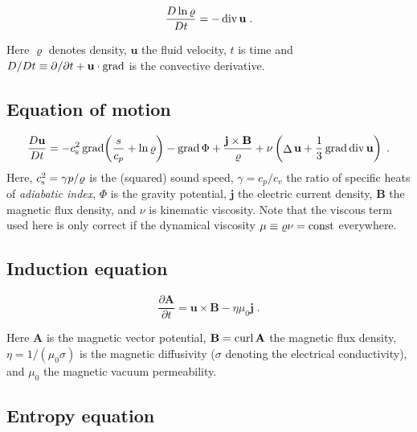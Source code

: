 \documentclass[12pt,twoside,notitlepage,a4paper]{article}
\newcommand{\grad}    {\mathop{\rm grad}\nolimits}
\newcommand{\Div}     {\mathop{\rm div}\nolimits}
\newcommand{\curl}    {\mathop{\rm curl}\nolimits}
\newcommand{\Laplace} {\mathop{\Delta}\nolimits}
\newcommand{\vekt}[1] {\mathbf{#1}}
\newcommand{\const}   {\mbox{\rm const}}
\newcommand{\Av}            {\vekt{A}}
\newcommand{\Bv}            {\vekt{B}}
\newcommand{\cs}            {c_{\rm s}}
\newcommand{\jv}            {\vekt{j}}
\newcommand{\uv}            {\vekt{u}}
\begin{document}
\begin{equation}
  \frac{D\ln\varrho}{Dt}
  = - \Div\uv \; .
\end{equation}

Here $\varrho$ denotes density, $\uv$ the fluid velocity, $t$ is time and
$D/Dt \equiv \partial/\partial t + \uv\cdot\grad$ is the convective
derivative.


\subsection{Equation of motion}

\begin{equation}
  \frac{D\uv}{Dt}
   =  -\cs^2\grad\biggl(\frac{s}{c_p} + \ln\varrho\biggr)
      - \grad\Phi
      + \frac{\jv\times\Bv}{\varrho}
      + \nu \left( \Laplace\uv + \frac{1}{3}\grad\Div\uv \right) \; .
\end{equation}
Here, $\cs^2 = \gamma p/\varrho$ is the (squared) sound speed,
$\gamma=c_p/c_v$ the ratio of specific heats of \emph{adiabatic index},
$\Phi$ is the gravity potential, $\jv$ the electric current density, $\Bv$
the magnetic flux density, and $\nu$ is kinematic viscosity.
Note that the viscous term used here is only correct if the dynamical
viscosity $\mu \equiv \varrho\nu = \const$ everywhere.


\subsection{Induction equation}

\begin{equation}
  \frac{\partial\Av}{\partial t}
  = \uv\times\Bv - \eta\mu_0\jv \; .
\end{equation}

Here $\Av$ is the magnetic vector potential,
$\Bv = \curl\Av$ the magnetic
flux density, $\eta = 1/(\mu_0\sigma)$ is the magnetic diffusivity
($\sigma$ denoting the electrical conductivity), and $\mu_0$ the
magnetic vacuum permeability.



\subsection{Entropy equation}
\end{document}
